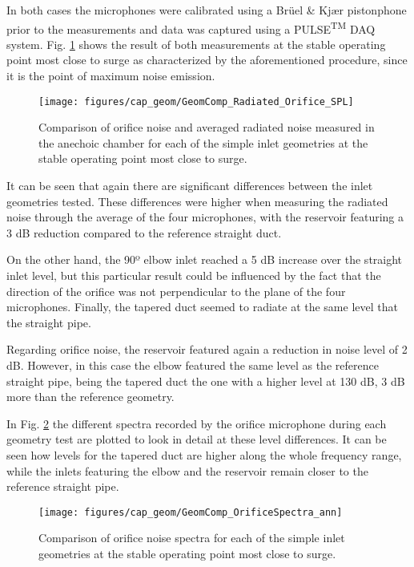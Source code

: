 In both cases the microphones were calibrated using a Brüel \& Kj\ae r pistonphone prior to the measurements and data was captured using a PULSE\textsuperscript{TM} DAQ system. Fig. \ref{fig:Radiated_Orifice_SPL_simple_geom} shows the result of both measurements at the stable operating point most close to surge as characterized by the aforementioned procedure, since it is the point of maximum noise emission.

\begin{figure}[htb!]
\centering
\texttt{[image: figures/cap\_geom/GeomComp\_Radiated\_Orifice\_SPL]}
\caption{Comparison of orifice noise and averaged radiated noise measured in the anechoic chamber for each of the simple inlet geometries at the stable operating point most close to surge.}
\label{fig:Radiated_Orifice_SPL_simple_geom}
\end{figure}

It can be seen that again there are significant differences between the inlet geometries tested. These differences were higher when measuring the radiated noise through the average of the four microphones, with the reservoir featuring a 3 dB reduction compared to the reference straight duct. 

On the other hand, the 90º elbow inlet reached a 5 dB increase over the straight inlet level, but this particular result could be influenced by the fact that the direction of the orifice was not perpendicular to the plane of the four microphones. Finally, the tapered duct seemed to radiate at the same level that the straight pipe.

Regarding orifice noise, the reservoir featured again a reduction in noise level of 2 dB. However, in this case the elbow featured the same level as the reference straight pipe, being the tapered duct the one with a higher level at 130 dB, 3 dB more than the reference geometry.

In Fig. \ref{fig:GeomComp_OrificeSpectra_ann} the different spectra recorded by the orifice microphone during each geometry test are plotted to look in detail at these level differences. It can be seen how levels for the tapered duct are higher along the whole frequency range, while the inlets featuring the elbow and the reservoir remain closer to the reference straight pipe.

\begin{figure}[htb!]
\centering
\texttt{[image: figures/cap\_geom/GeomComp\_OrificeSpectra\_ann]}
\caption{Comparison of orifice noise spectra for each of the simple inlet geometries at the stable operating point most close to surge.}
\label{fig:GeomComp_OrificeSpectra_ann}
\end{figure}

